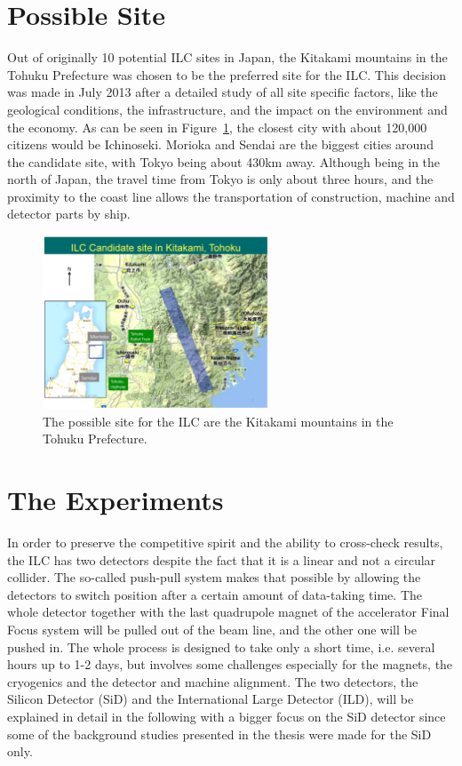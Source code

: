 \section{Possible Site}
\label{ILC:site}
Out of originally 10 potential ILC sites in Japan, the Kitakami mountains in the Tohuku Prefecture was chosen to be the preferred site for the ILC.
This decision was made in July 2013 after a detailed study of all site specific factors, like the geological conditions, the infrastructure, and the impact on the environment and the economy.
As can be seen in Figure~\ref{fig:ILC_Site}, the closest city with about 120,000 citizens would be Ichinoseki.
Morioka and Sendai are the biggest cities around the candidate site, with Tokyo being about \unit{430}{km} away.
Although being in the north of Japan, the travel time from Tokyo is only about three hours, and the proximity to the coast line allows the transportation of construction, machine and detector parts by ship.

\begin{figure}
\centering
\includegraphics[width=0.6\textwidth]{Figures/ILC-site.jpg}
\caption[Possible site for the ILC]{The possible site for the ILC are the Kitakami mountains in the Tohuku Prefecture.\cite{Site}}
\label{fig:ILC_Site}
\end{figure}

\section{The Experiments}
\label{ILC:detectors}

In order to preserve the competitive spirit and the ability to cross-check results, the ILC has two detectors despite the fact that it is a linear and not a circular collider.
The so-called push-pull system makes that possible by allowing the detectors to switch position after a certain amount of data-taking time.
The whole detector together with the last quadrupole magnet of the accelerator Final Focus system will be pulled out of the beam line, and the other one will be pushed in.
The whole process is designed to take only a short time, i.e. several hours up to 1-2 days, but involves some challenges especially for the magnets, the cryogenics and the detector and machine alignment.\cite[p. 28-29]{TDR1}
The two detectors, the Silicon Detector (SiD) and the International Large Detector (ILD), will be explained in detail in the following with a bigger focus on the SiD detector since some of the background studies presented in the thesis were made for the SiD only.

